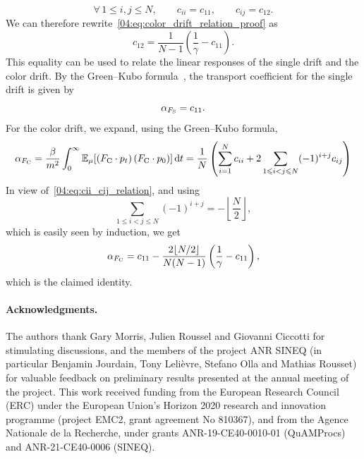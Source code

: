  \begin{equation}
 \label{04:eq:cii_cij_relation}
     \forall \,1\leq i,j\leq N,\qquad c_{ii}=c_{11},\qquad c_{ij}=c_{12}.
 \end{equation}
 We can therefore rewrite~\eqref{04:eq:color_drift_relation_proof} as 
 \begin{equation}\label{04:eq:c12_c11_relation}c_{12}=\frac{1}{N-1}\left(\frac{1}{\gamma}-c_{11}\right).\end{equation}
This equality can be used to relate the linear responses of the single drift and the color drift.
By the Green--Kubo formula~\cite{R89}, the transport coefficient for the single drift is given by
\[\alpha_{F_{\mathrm{S}}}=c_{11}.\]
For the color drift, we expand, using the Green--Kubo formula,
\[\alpha_{F_{\mathrm{C}}}=\frac{\beta}{m^2} \int_0^\infty \mathbb{E}_\mu[\left(F_{\mathrm{C}}\cdot p_t\right)\left(F_{\mathrm{C}}\cdot p_0\right)]\,\mathrm{d} t=\frac1N\left(\sum_{i=1}^N c_{ii} + 2\sum_{1\leqslant i< j\leqslant N}(-1)^{i+j}c_{ij}\right)\]
In view of~\eqref{04:eq:cii_cij_relation}, and using
\[\sum_{1\leq i< j\leq N}(-1)^{i+j}=-\left\lfloor \frac{N}{2}\right\rfloor,\]
which is easily seen by induction, we get
\begin{equation}
    \alpha_{F_{\mathrm{C}}}=c_{11}-\frac{2\lfloor N/2 \rfloor}{N(N-1)}\left(\frac1{\gamma}-c_{11}\right),
\end{equation}
which is the claimed identity.

\paragraph{Acknowledgments.}
The authors thank Gary Morris, Julien Roussel and Giovanni Ciccotti for stimulating discussions, and the
members of the project ANR SINEQ (in particular Benjamin Jourdain, Tony
Lelièvre, Stefano Olla and Mathias Rousset) for valuable feedback on preliminary
results presented at the annual meeting of the project. This work
received funding from the European Research Council (ERC) under the
European Union's Horizon 2020 research and innovation programme (project
EMC2, grant agreement No 810367), and from the Agence Nationale de la
Recherche, under grants ANR-19-CE40-0010-01 (QuAMProcs) and
ANR-21-CE40-0006 (SINEQ).